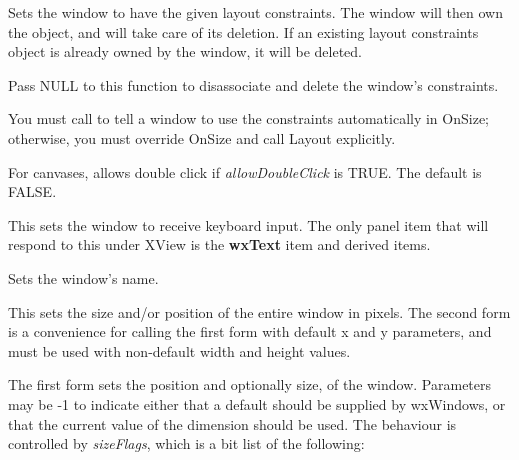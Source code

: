 \label{wxwindowsetconstraints}


Sets the window to have the given layout constraints. The window
will then own the object, and will take care of its deletion.
If an existing layout constraints object is already owned by the
window, it will be deleted.

Pass NULL to this function to disassociate and delete the window's
constraints.

You must call  to tell a window to use
the constraints automatically in OnSize; otherwise, you must
override OnSize and call Layout explicitly.

\label{setdoubleclick}


For canvases, allows double click if {\it allowDoubleClick} is TRUE. The default is FALSE.

\label{winsetfocus}


This sets the window to receive keyboard input. The only panel item that will
respond to this under XView is the {\bf wxText} item and derived items.

\label{wxwindowsetname}


Sets the window's name.




This sets the size and/or position of the entire window in pixels.
The second form is a convenience for calling the first form with default
x and y parameters, and must be used with non-default width and height values.

The first form sets the position and optionally size, of the window.
Parameters may be -1 to indicate either that a default should be supplied
by wxWindows, or that the current value of the dimension should be used.
The behaviour is controlled by {\it sizeFlags}, which is a bit list of the
following:

